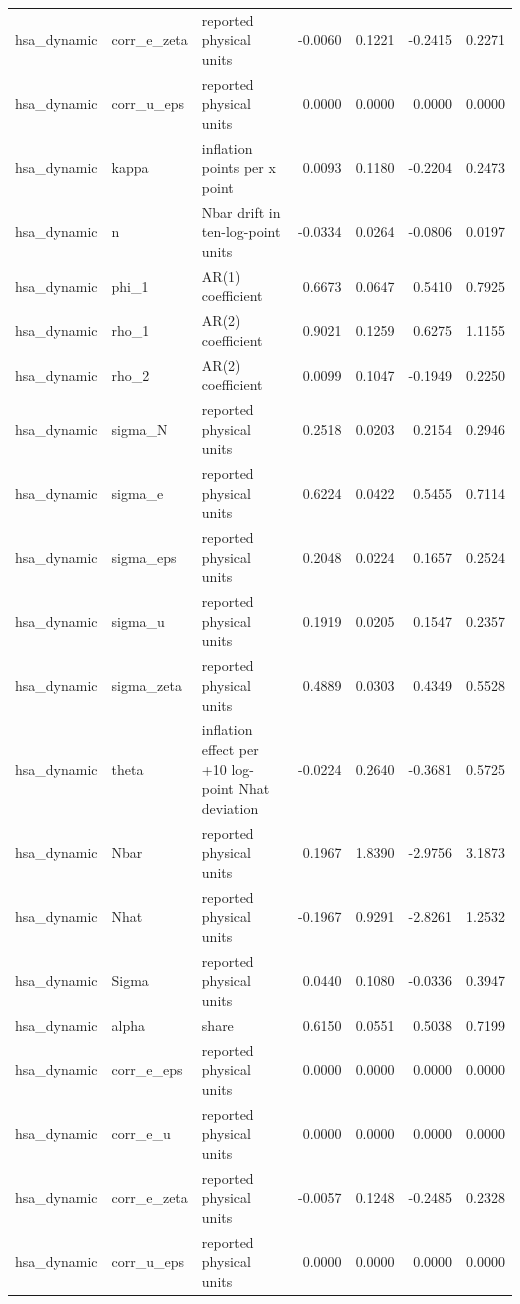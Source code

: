 \begin{tabular}{lllrrrr}
hsa\_dynamic & corr\_e\_zeta & reported physical units & -0.0060 & 0.1221 & -0.2415 & 0.2271 \\
hsa\_dynamic & corr\_u\_eps & reported physical units & 0.0000 & 0.0000 & 0.0000 & 0.0000 \\
hsa\_dynamic & kappa & inflation points per x point & 0.0093 & 0.1180 & -0.2204 & 0.2473 \\
hsa\_dynamic & n & Nbar drift in ten-log-point units & -0.0334 & 0.0264 & -0.0806 & 0.0197 \\
hsa\_dynamic & phi\_1 & AR(1) coefficient & 0.6673 & 0.0647 & 0.5410 & 0.7925 \\
hsa\_dynamic & rho\_1 & AR(2) coefficient & 0.9021 & 0.1259 & 0.6275 & 1.1155 \\
hsa\_dynamic & rho\_2 & AR(2) coefficient & 0.0099 & 0.1047 & -0.1949 & 0.2250 \\
hsa\_dynamic & sigma\_N & reported physical units & 0.2518 & 0.0203 & 0.2154 & 0.2946 \\
hsa\_dynamic & sigma\_e & reported physical units & 0.6224 & 0.0422 & 0.5455 & 0.7114 \\
hsa\_dynamic & sigma\_eps & reported physical units & 0.2048 & 0.0224 & 0.1657 & 0.2524 \\
hsa\_dynamic & sigma\_u & reported physical units & 0.1919 & 0.0205 & 0.1547 & 0.2357 \\
hsa\_dynamic & sigma\_zeta & reported physical units & 0.4889 & 0.0303 & 0.4349 & 0.5528 \\
hsa\_dynamic & theta & inflation effect per +10 log-point Nhat deviation & -0.0224 & 0.2640 & -0.3681 & 0.5725 \\
hsa\_dynamic & Nbar & reported physical units & 0.1967 & 1.8390 & -2.9756 & 3.1873 \\
hsa\_dynamic & Nhat & reported physical units & -0.1967 & 0.9291 & -2.8261 & 1.2532 \\
hsa\_dynamic & Sigma & reported physical units & 0.0440 & 0.1080 & -0.0336 & 0.3947 \\
hsa\_dynamic & alpha & share & 0.6150 & 0.0551 & 0.5038 & 0.7199 \\
hsa\_dynamic & corr\_e\_eps & reported physical units & 0.0000 & 0.0000 & 0.0000 & 0.0000 \\
hsa\_dynamic & corr\_e\_u & reported physical units & 0.0000 & 0.0000 & 0.0000 & 0.0000 \\
hsa\_dynamic & corr\_e\_zeta & reported physical units & -0.0057 & 0.1248 & -0.2485 & 0.2328 \\
hsa\_dynamic & corr\_u\_eps & reported physical units & 0.0000 & 0.0000 & 0.0000 & 0.0000 \\

\end{tabular}

